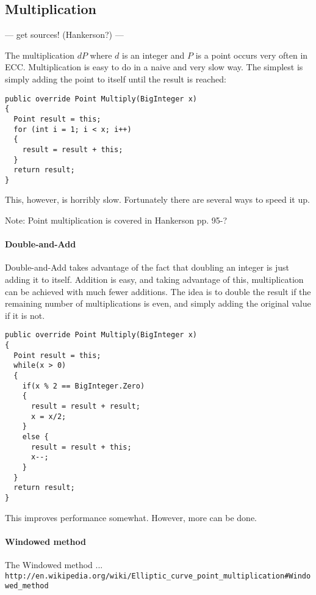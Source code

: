 \subsection{Multiplication}

--- get sources! (Hankerson?) ---

The multiplication \(dP\) where \(d\) is an integer and \(P\) is a point occurs very often in ECC. Multiplication
is easy to do in a naive and very slow way. The simplest is simply adding the point to itself until the result is
reached:

\begin{verbatim}
public override Point Multiply(BigInteger x)
{
  Point result = this;
  for (int i = 1; i < x; i++)
  {
    result = result + this;
  }
  return result;
}
\end{verbatim}

This, however, is horribly slow. Fortunately there are several ways to speed it up.

Note: Point multiplication is covered in Hankerson pp. 95-?

\paragraph{Double-and-Add}

Double-and-Add takes advantage of the fact that doubling an integer is just adding it to itself. Addition is easy,
and taking advantage of this, multiplication can be achieved with much fewer additions. The idea is to double the
result if the remaining number of multiplications is even, and simply adding the original value if it is not.

\begin{verbatim}
public override Point Multiply(BigInteger x)
{
  Point result = this;
  while(x > 0)
  {
    if(x % 2 == BigInteger.Zero)
    {
      result = result + result;
      x = x/2;
    }
    else {
      result = result + this;
      x--;
    }
  }
  return result;
}
\end{verbatim}

This improves performance somewhat. However, more can be done.

\paragraph{Windowed method}

The Windowed method ... \verb+http://en.wikipedia.org/wiki/Elliptic_curve_point_multiplication#Windowed_method+